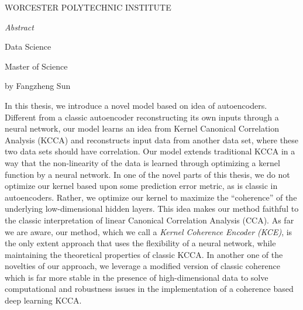 \documentclass[12pt]{report} %
\begin{document}
\begin{center}
	WORCESTER POLYTECHNIC INSTITUTE\\
	\vspace{1 in}
	\begin{Large}
		\emph{Abstract}\\
	\end{Large}
	\vspace{30 bp}
	\begin{small}
		Data Science\\
	\end{small}
	\vspace{15 bp}
	\begin{small}
		Master of Science\\
	\end{small}
	\vspace{15 bp}
	\begin{small}
		by Fangzheng Sun\\
	\end{small}
\end{center}
In this thesis, we introduce a novel model based on idea of autoencoders. Different from a classic autoencoder reconstructing its own inputs through a neural network, our model learns an idea from Kernel Canonical Correlation Analysis (KCCA) and reconstructs input data from another data set, where these two data sets should have correlation. Our model extends traditional KCCA in a way that the non-linearity of the data is learned through optimizing a kernel function by a neural network. In one of the novel parts of this thesis, we do not optimize our kernel based upon some prediction error metric, as is classic in autoencoders. Rather, we optimize our kernel to maximize the ``coherence'' of the underlying low-dimensional hidden layers. This idea makes our method faithful to the classic interpretation of linear Canonical Correlation Analysis (CCA). 
As far we are aware, our method, which we call a \textit{Kernel Coherence Encoder (KCE)},  is the only extent approach that uses the flexibility of a neural network, while maintaining the theoretical properties of classic KCCA. In another one of the novelties of our approach, we leverage a modified version of classic coherence which is far more stable in the presence of high-dimensional data to solve computational and robustness issues in the implementation of a coherence based deep learning KCCA.

\clearpage
\end{document}
